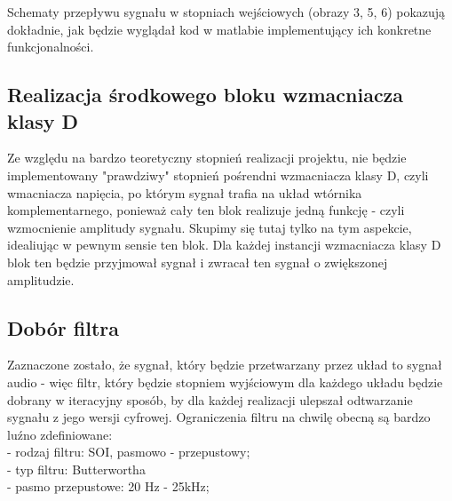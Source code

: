 \documentclass{article}
\begin{document}
Schematy przepływu sygnału w stopniach wejściowych (obrazy 3, 5, 6) pokazują dokładnie, jak będzie wyglądał 
kod w matlabie implementujący ich konkretne funkcjonalności.
\subsection{Realizacja środkowego bloku wzmacniacza klasy D}
Ze względu na bardzo teoretyczny stopnień realizacji projektu, nie będzie implementowany 
"prawdziwy" stopnień pośrendni wzmacniacza klasy D, czyli wmacniacza napięcia, po którym sygnał trafia na układ wtórnika 
komplementarnego, ponieważ cały ten blok realizuje jedną funkcję - czyli wzmocnienie amplitudy sygnału. Skupimy się 
tutaj tylko na tym aspekcie, idealiując w pewnym sensie ten blok. Dla każdej instancji wzmacniacza klasy D blok ten 
będzie przyjmował sygnał i zwracał ten sygnał o zwiększonej amplitudzie. \\

\subsection{Dobór filtra}

Zaznaczone zostało, że sygnał, który będzie przetwarzany przez układ to sygnał audio - więc filtr, który 
będzie stopniem wyjściowym dla każdego układu będzie dobrany w iteracyjny sposób, by dla każdej realizacji ulepszał odtwarzanie 
sygnału z jego wersji cyfrowej. Ograniczenia filtru na chwilę obecną są bardzo luźno zdefiniowane:
\\
- rodzaj filtru: SOI, pasmowo - przepustowy; \\
- typ filtru: Butterwortha \\
- pasmo przepustowe: 20 Hz - 25kHz; \\
\end{document}
